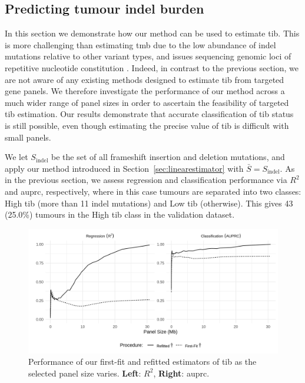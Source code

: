\documentclass[12pt]{article}
\begin{document}


\subsection{Predicting tumour indel burden \label{sec:indel}}
In this section we demonstrate how our method can be used to estimate \acrshort{tib}. 
This is more challenging than estimating \acrshort{tmb} due to the low abundance of indel mutations relative to other variant types, and issues sequencing genomic loci of repetitive nucleotide constitution \citep{narzisi_challenge_2015}. Indeed, in contrast to the previous section, we are not aware of any existing methods designed to estimate \acrshort{tib} from targeted gene panels. We therefore investigate the performance of our method across a much wider range of panel sizes in order to ascertain the feasibility of targeted \acrshort{tib} estimation. Our results demonstrate that accurate classification of \acrshort{tib} status is still possible, even though estimating the precise value of \acrshort{tib} is difficult with small panels.  

We let $S_{\text{indel}}$ be the set of all frameshift insertion and deletion mutations, and apply our method introduced in Section~\ref{sec:linearestimator} with $\bar{S} = S_{\text{indel}}$. As in the previous section, we assess regression and classification performance via $R^2$ and \acrshort{auprc}, respectively, where in this case tumours are separated into two classes: High \acrshort{tib} (more than 11 indel mutations) and Low \acrshort{tib} (otherwise). This gives 43 (25.0\%) tumours in the High \acrshort{tib} class in the validation dataset. 

\begin{figure}[htbp]
\centering
\includegraphics[width=6in]{indel_panel_stats.png}
\vspace*{-5mm}
\caption{Performance of our first-fit and refitted estimators of \acrshort{tib} as the selected panel size varies. \textbf{Left}: $R^2$, \textbf{Right}: \acrshort{auprc}. \label{fig:indelstatsplot}}
\vspace*{-2mm}
\end{figure}
\end{document}
